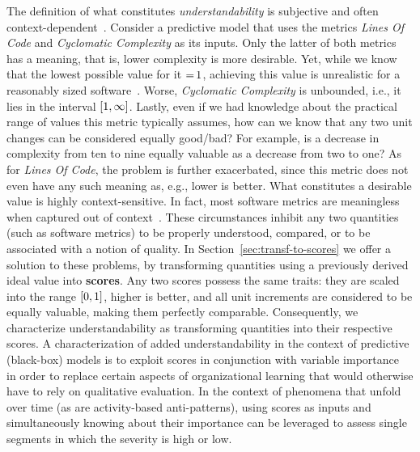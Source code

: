 The definition of what constitutes \emph{understandability} is subjective and often context-dependent~\cite{zagzebski2017whatis}.
Consider a predictive model that uses the metrics \emph{Lines Of Code} and \emph{Cyclomatic Complexity} as its inputs.
Only the latter of both metrics has a meaning, that is, lower complexity is more desirable.
Yet, while we know that the lowest possible value for it ${=}\,1$, achieving this value is unrealistic for a reasonably sized software~\cite{McCabe76}.
Worse, \emph{Cyclomatic Complexity} is unbounded, i.e., it lies in the interval $\interval{1}{\infty}$.
Lastly, even if we had knowledge about the practical range of values this metric typically assumes, how can we know that any two unit changes can be considered equally good/bad?
For example, is a decrease in complexity from ten to nine equally valuable as a decrease from two to one?
As for \emph{Lines Of Code}, the problem is further exacerbated, since this metric does not even have any such meaning as, e.g., lower is better.
What constitutes a desirable value is highly context-sensitive.
In fact, most software metrics are meaningless when captured out of context~\cite{gil2016meannothing}.
These circumstances inhibit any two quantities (such as software metrics) to be properly understood, compared, or to be associated with a notion of quality.
In Section~\ref{sec:transf-to-scores} we offer a solution to these problems, by transforming quantities using a previously derived ideal value into \textbf{scores}.
Any two scores possess the same traits: they are scaled into the range $\interval{0}{1}$, higher is better, and all unit increments are considered to be equally valuable, making them perfectly comparable.
Consequently, we characterize understandability as transforming quantities into their respective scores.
%
A characterization of added understandability in the context of predictive (black-box) models is to exploit scores in conjunction with variable importance~\cite{zhu2015varimp} in order to replace certain aspects of organizational learning that would otherwise have to rely on qualitative evaluation.
In the context of phenomena that unfold over time (as are activity-based anti-patterns), using scores as inputs and simultaneously knowing about their importance can be leveraged to assess single segments in which the severity is high or low.


